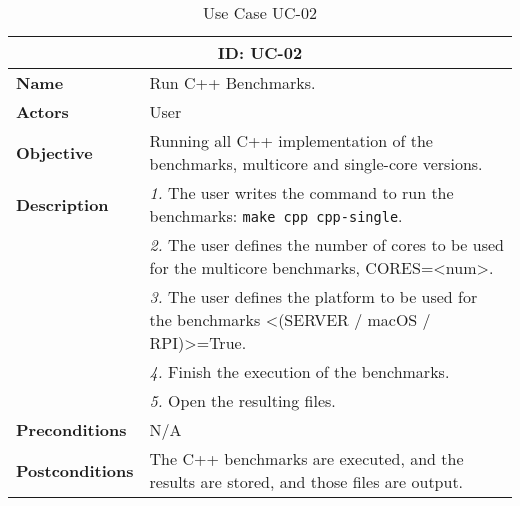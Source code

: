 \begin{table}[H]
    \centering
    \begin{tabular}{l p{10cm}}
        \toprule
        \multicolumn{2}{c}{\textbf{ID: UC-02}} \\
        \toprule
        \textbf{Name}                         &  Run C++ Benchmarks. \\
        \textbf{Actors}                       &  User \\
        \textbf{Objective}                    &  Running all C++ implementation of the benchmarks, multicore and single-core versions. \\
        \multirow{1}{*}{\textbf{Description}} & \textsl{1.} The user writes the command to run the benchmarks: \texttt{make cpp cpp-single}.\\
                                              & \textsl{2.} The user defines the number of cores to be used for the multicore benchmarks, CORES=<num>.\\
                                              & \textsl{3.} The user defines the platform to be used for the benchmarks <(SERVER / macOS / RPI)>=True.\\
                                              & \textsl{4.} Finish the execution of the benchmarks.\\
                                              & \textsl{5.} Open the resulting files.\\
        \textbf{Preconditions}                &  N/A \\
        \textbf{Postconditions}               &  The C++ benchmarks are executed, and the results are stored, and those files are output. \\
    \end{tabular}
    \caption{Use Case UC-02}
    \label{tab:uc-single-core 02}
\end{table}

